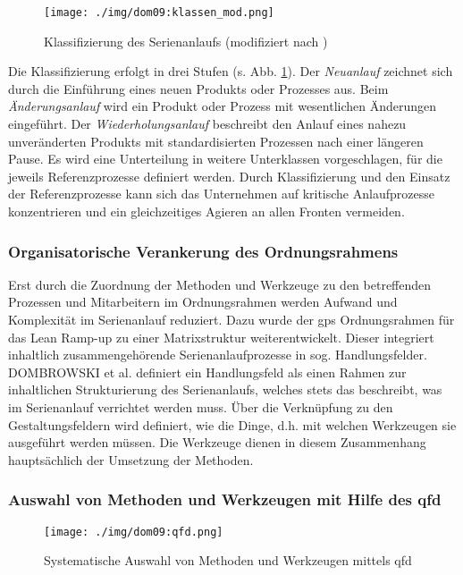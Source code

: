\begin{figure}[ht]
 \centering
 \texttt{[image: ./img/dom09:klassen\_mod.png]}
 \caption[Klassifizierung des Serienanlaufs]{Klassifizierung des Serienanlaufs (modifiziert nach \cite{Dombrowski2009})}
 \label{fig:anlaufklassen}
\end{figure}

Die Klassifizierung erfolgt in drei Stufen (s. Abb. \ref{fig:anlaufklassen}). 
Der \textit{Neuanlauf} zeichnet sich durch die Einführung eines neuen Produkts oder Prozesses aus. 
Beim \textit{Änderungsanlauf} wird ein Produkt oder Prozess mit wesentlichen Änderungen eingeführt. Der \textit{Wiederholungsanlauf} beschreibt den Anlauf eines nahezu unveränderten Produkts mit standardisierten Prozessen nach einer längeren Pause. 
Es wird eine Unterteilung in weitere Unterklassen vorgeschlagen, für die jeweils Referenzprozesse definiert werden. 
Durch Klassifizierung und den Einsatz der Referenzprozesse kann sich das Unternehmen auf kritische Anlaufprozesse konzentrieren und ein gleichzeitiges Agieren an allen Fronten vermeiden.

\subsubsection{Organisatorische Verankerung des Ordnungsrahmens}
Erst durch die Zuordnung der Methoden und Werkzeuge zu den betreffenden Prozessen und Mitarbeitern im Ordnungsrahmen werden Aufwand und Komplexität im Serienanlauf reduziert. Dazu wurde der \gls{gps} Ordnungsrahmen für das Lean Ramp-up zu einer Matrixstruktur weiterentwickelt. Dieser integriert inhaltlich zusammengehörende Serienanlaufprozesse in sog. Handlungsfelder. DOMBROWSKI et al. definiert ein Handlungsfeld als einen Rahmen zur inhaltlichen Strukturierung des Serienanlaufs, welches stets das beschreibt, was im Serienanlauf verrichtet werden muss. Über die Verknüpfung zu den Gestaltungsfeldern wird definiert, wie die Dinge, d.h. mit welchen Werkzeugen sie ausgeführt werden müssen. Die Werkzeuge dienen in diesem Zusammenhang hauptsächlich der Umsetzung der Methoden. 

\subsubsection{Auswahl von Methoden und Werkzeugen mit Hilfe des \gls{qfd}}

\begin{figure}[ht]
 \centering
 \texttt{[image: ./img/dom09:qfd.png]}
 \caption[Systematische Auswahl von Methoden und Werkzeugen mittels \gls{qfd}]{Systematische Auswahl von Methoden und Werkzeugen mittels \gls{qfd} \autocite{Dombrowski2009}}
 \label{fig:qfd}
\end{figure}

